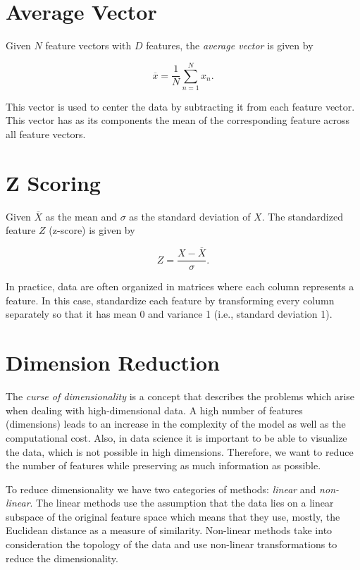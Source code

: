 \section{Average Vector}

Given \(N\) feature vectors with \(D\) features, the \emph{average vector} is given
by

\[
	\overline{x} = \frac{1}{N} \sum_{n = 1}^{N} x_n.
\]

This vector is used to center the data by subtracting it from each feature vector. This vector has as its components the mean of the corresponding 
feature across all feature vectors.

\section{Z Scoring}

Given \(\overline{X}\) as the mean and \(\sigma\) as the standard deviation of \(X\). The standardized feature
\(Z\) (z-score) is given by

\[
	Z = \frac{X - \overline{X}}{\sigma}.
\]

In practice, data are often organized in matrices where each column represents a feature.
In this case, standardize each feature by transforming every column separately so that it has mean 0 and variance 1 (i.e., standard deviation 1).

\section{Dimension Reduction}

The \emph{curse of dimensionality} is a concept that describes the problems which arise when dealing with high-dimensional data. A high
number of features (dimensions) leads to an increase in the complexity of the model as well as the computational cost. Also, in data science it
is important to be able to visualize the data, which is not possible in high dimensions. Therefore, we want to reduce the number of features while
preserving as much information as possible.

To reduce dimensionality we have two categories of methods: \emph{linear} and \emph{non-linear}. The linear methods use the assumption that the data lies on a linear subspace of the original feature space which
means that they use, mostly, the Euclidean distance as a measure of similarity. Non-linear methods take into consideration the topology of the data and use non-linear transformations to reduce the dimensionality.

